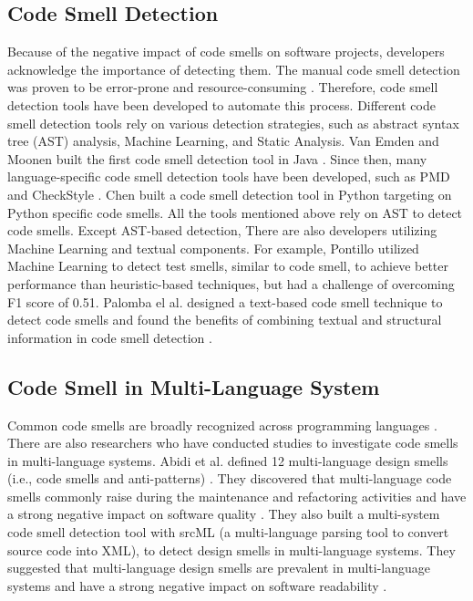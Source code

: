 \subsection{Code Smell Detection}
\label{sec:Code Smell Detection}
Because of the negative impact of code smells on software projects, developers acknowledge the importance of detecting them. The manual code smell detection was proven to be
error-prone and resource-consuming \cite{DetectingDefectsInObject-orientedDesigns}. Therefore, code smell detection tools have been developed to automate this process.
Different code smell detection tools rely on various detection strategies, such as abstract syntax tree (AST) analysis, Machine Learning, and Static Analysis.
Van Emden and Moonen built the first code smell detection tool in Java \cite{1173068}. Since then,
many language-specific code smell detection tools have been developed, such as PMD \cite{PMD} and CheckStyle \cite{CheckStyle}.
Chen \cite{Pysmell} built a code smell detection tool in Python targeting on Python specific code smells.
All the tools mentioned above rely on AST to detect code smells. Except AST-based detection, There are also developers utilizing Machine Learning and textual components. 
For example, Pontillo utilized Machine Learning to detect test smells, similar to code smell, to achieve better performance than heuristic-based techniques, but had a challenge of overcoming F1 score of 0.51.
Palomba el al. designed a text-based code smell technique to detect code smells and found the benefits of combining textual and structural information in code smell detection \cite{Palomba}.
\subsection{Code Smell in Multi-Language System}
\label{sec: Code Smell in Multi-Language System}

Common code smells are broadly recognized across programming languages \cite{Pysmell,PMD,CheckStyle,Jscent,DesigniteJava}. 
There are also researchers who have conducted studies to investigate code smells in multi-language systems.
Abidi et al. defined 12 multi-language design smells (i.e., code smells and anti-patterns) \cite{MultiLanguageCodeSmells}. They discovered that multi-language code smells commonly raise during the maintenance and refactoring activities
 and have a strong negative impact on software quality \cite{Abidi2}. They also built a multi-system code smell detection tool with srcML (a multi-language parsing tool to convert source code into XML), to
 detect design smells in multi-language systems. They suggested that multi-language design smells are prevalent in multi-language systems and have a strong negative impact on software readability \cite{Fault-Prone}.

